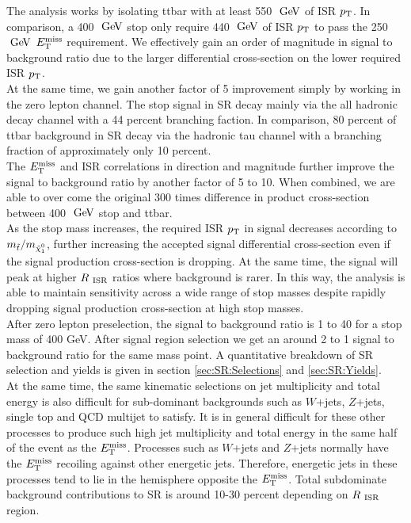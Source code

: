 \indent The analysis works by isolating ttbar with at least 550 $\gev$ of ISR $p_{\mathrm{T}}$.  In comparison, a 400 $\gev$ stop only require 440 $\gev$ of ISR $p_{\mathrm{T}}$ to pass the 250 $\gev$ $E_{\mathrm{T}}^{\mathrm{miss}}$ requirement.  We effectively gain an order of magnitude in signal to background ratio due to the larger differential cross-section on the lower required ISR $p_{\mathrm{T}}$.  \\

\indent At the same time, we gain another factor of 5 improvement simply by working in the zero lepton channel.  The stop signal in SR decay mainly via the all hadronic decay channel with a 44 percent branching faction.  In comparison, 80 percent of ttbar background in SR decay via the hadronic tau channel with a branching fraction of approximately only 10 percent.  \\

\indent The $E_{\mathrm{T}}^{\mathrm{miss}}$ and ISR correlations in direction and magnitude further improve the signal to background ratio by another factor of 5 to 10.  When combined, we are able to over come the original 300 times difference in product cross-section between 400 $\gev$ stop and ttbar.  \\

\indent As the stop mass increases, the required ISR $p_{\mathrm{T}}$ in signal decreases according to $m_{\stop}/m_{\ninoone}$, further increasing the accepted signal differential cross-section even if the signal production cross-section is dropping.  At the same time, the signal will peak at higher $R_{~\mathrm{ISR}}$ ratios where background is rarer.  In this way, the analysis is able to maintain sensitivity across a wide range of stop masses despite rapidly dropping signal production cross-section at high stop masses.  \\

\indent After zero lepton preselection, the signal to background ratio is 1 to 40 for a stop mass of 400 GeV.  After signal region selection we get an around 2 to 1 signal to background ratio for the same mass point.  A quantitative breakdown of SR selection and yields is given in section \ref{sec:SR:Selections} and \ref{sec:SR:Yields}.  \\

\indent At the same time, the same kinematic selections on jet multiplicity and total energy is also difficult for sub-dominant backgrounds such as $W$+jets, $Z$+jets, single top and QCD multijet to satisfy.  It is in general difficult for these other processes to produce such high jet multiplicity and total energy in the same half of the event as the $E_{\mathrm{T}}^{\mathrm{miss}}$.   Processes such as $W$+jets and $Z$+jets normally have the $E_{\mathrm{T}}^{\mathrm{miss}}$ recoiling against other energetic jets.  Therefore, energetic jets in these processes tend to lie in the hemisphere opposite the $E_{\mathrm{T}}^{\mathrm{miss}}$.  Total subdominate background contributions to SR is around 10-30 percent depending on $R_{~\mathrm{ISR}}$ region.  \\

